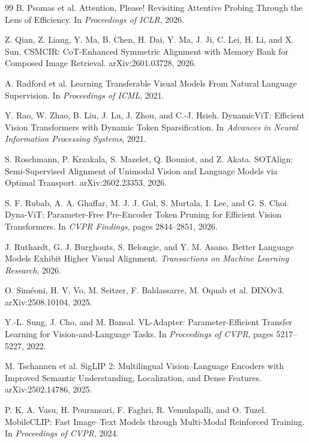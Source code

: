 \documentclass[11pt,a4paper,oneside]{report}
\begin{document}
\begin{thebibliography}{99}
B. Psomas et al.
\newblock Attention, Please! Revisiting Attentive Probing Through the Lens of
Efficiency.
\newblock In \emph{Proceedings of ICLR}, 2026.

Z. Qian, Z. Liang, Y. Ma, B. Chen, H. Dai, Y. Ma, J. Ji, C. Lei, H. Li, and
X. Sun.
\newblock CSMCIR: CoT-Enhanced Symmetric Alignment with Memory Bank for
Composed Image Retrieval.
\newblock arXiv:2601.03728, 2026.

A. Radford et al.
\newblock Learning Transferable Visual Models From Natural Language Supervision.
\newblock In \emph{Proceedings of ICML}, 2021.

Y. Rao, W. Zhao, B. Liu, J. Lu, J. Zhou, and C.-J. Hsieh.
\newblock DynamicViT: Efficient Vision Transformers with Dynamic Token
Sparsification.
\newblock In \emph{Advances in Neural Information Processing Systems}, 2021.

S. Roschmann, P. Krzakala, S. Mazelet, Q. Bouniot, and Z. Akata.
\newblock SOTAlign: Semi-Supervised Alignment of Unimodal Vision and Language
Models via Optimal Transport.
\newblock arXiv:2602.23353, 2026.

S. F. Rubab, A. A. Ghaffar, M. J. J. Gul, S. Murtala, I. Lee, and G. S. Choi.
\newblock Dyna-ViT: Parameter-Free Pre-Encoder Token Pruning for Efficient
Vision Transformers.
\newblock In \emph{CVPR Findings}, pages 2844--2851, 2026.

J. Ruthardt, G. J. Burghouts, S. Belongie, and Y. M. Asano.
\newblock Better Language Models Exhibit Higher Visual Alignment.
\newblock \emph{Transactions on Machine Learning Research}, 2026.

O. Sim\'eoni, H. V. Vo, M. Seitzer, F. Baldassarre, M. Oquab et al.
\newblock DINOv3.
\newblock arXiv:2508.10104, 2025.

Y.-L. Sung, J. Cho, and M. Bansal.
\newblock VL-Adapter: Parameter-Efficient Transfer Learning for
Vision-and-Language Tasks.
\newblock In \emph{Proceedings of CVPR}, pages 5217--5227, 2022.

M. Tschannen et al.
\newblock SigLIP 2: Multilingual Vision--Language Encoders with Improved
Semantic Understanding, Localization, and Dense Features.
\newblock arXiv:2502.14786, 2025.

P. K. A. Vasu, H. Pouransari, F. Faghri, R. Vemulapalli, and O. Tuzel.
\newblock MobileCLIP: Fast Image--Text Models through Multi-Modal Reinforced
Training.
\newblock In \emph{Proceedings of CVPR}, 2024.


\end{thebibliography}
\end{document}

